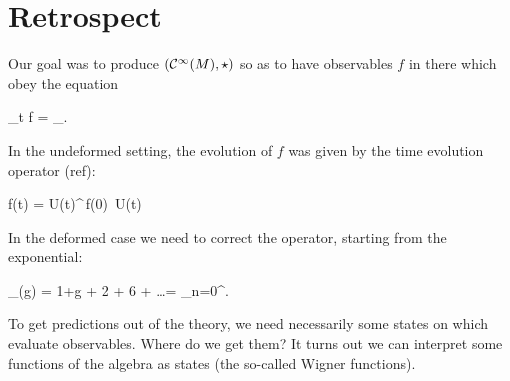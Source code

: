 \documentclass[main.tex]{subfiles}
\begin{document}
\section{Retrospect}
Our goal was to produce $(\mathcal{C}^\infty(M), \star)$ so as to have observables $f$ in there which obey the equation
\begin{eqalign}
	\partial_t f = \planck [f,h]_\star.
\end{eqalign}
In the undeformed setting, the evolution of $f$ was given by the time evolution operator (ref):
\begin{eqalign}
	f(t) = U(t)^\dagger \,f(0)\, U(t)
\end{eqalign}
In the deformed case we need to correct the operator, starting from the exponential:
\begin{eqalign}
	\exp_\star (g) = 1+g + 2 + 6 + \ldots = \sum_{n=0}^\infty {}.
\end{eqalign}
To get predictions out of the theory, we need necessarily some states on which evaluate observables. Where do we get them? It turns out we can interpret some functions of the algebra as states (the so-called Wigner functions).
\end{document}
